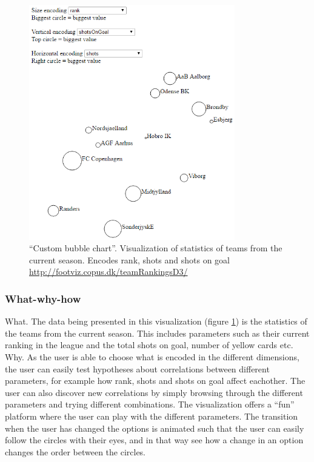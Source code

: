 \documentclass[Report.tex]{subfiles}
\begin{document}
\begin{figure}
\center
\includegraphics[width=0.8\textwidth]{"Figures/bubble_chart"}
\caption{``Custom bubble chart''. Visualization of statistics of teams from the current season. Encodes rank, shots and shots on goal \url{http://footviz.copus.dk/teamRankingsD3/}}
\label{Fig:Bubbleviz}
\end{figure}

\subsubsection{What-why-how}
What. The data being presented in this visualization (figure \ref{Fig:Bubbleviz}) is the statistics of the teams from the current season. This includes parameters such as their current ranking in the league and the total shots on goal, number of yellow cards etc.\\

\noindent Why. As the user is able to choose what is encoded in the different dimensions, the user can easily test hypotheses about correlations between different parameters, for example how rank, shots and shots on goal affect eachother. The user can also discover new correlations by simply browsing through the different parameters and trying different combinations. The visualization offers a ``fun'' platform where the user can play with the different parameters. The transition when the user has changed the options is animated such that the user can easily follow the circles with their eyes, and in that way see how a change in an option changes the order between the circles.\\
\end{document}
